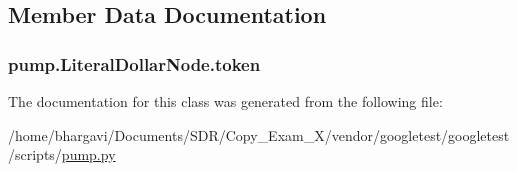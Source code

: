 \subsection{Member Data Documentation}
\subsubsection[{\texorpdfstring{token}{token}}]{\setlength{\rightskip}{0pt plus 5cm}pump.\+Literal\+Dollar\+Node.\+token}\hypertarget{classpump_1_1_literal_dollar_node_ab4c6e209635b8868bcdf0fe8053431c6}{}\label{classpump_1_1_literal_dollar_node_ab4c6e209635b8868bcdf0fe8053431c6}


The documentation for this class was generated from the following file\+:\begin{DoxyCompactItemize}
\item 
/home/bhargavi/\+Documents/\+S\+D\+R/\+Copy\+\_\+\+Exam\+\_\+X/vendor/googletest/googletest/scripts/\hyperlink{pump_8py}{pump.\+py}\end{DoxyCompactItemize}
